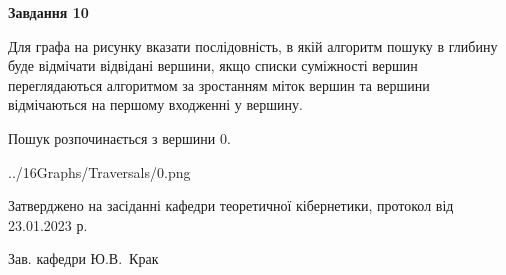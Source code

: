 \documentclass[12pt, ukrainian]{article}
\begin{document}
{\begin {large}
{\begin {center}\textbf{Завдання 10}\end {center}}\par
Для графа на рисунку вказати послідовність, в якій алгоритм пошуку в глибину буде відмічати відвідані вершини, якщо списки суміжності вершин переглядаються алгоритмом за зростанням міток вершин та вершини відмічаються на першому вход\-женні у вершину.\par
Пошук розпочинається з вершини 0.\par

\begin{center}
	{../16Graphs/Traversals/0.png}
\end{center}\par
\newpage


\end {large}
}
{\smallskip \begin {small} Затверджено на засіданні кафедри теоретичної кібернетики, протокол  від   23.01.2023 р.\par\smallskip\smallskip
{\parbox {6.5 cm}{Зав. кафедри \dotfill Ю.В.~Крак}} \end{small}}
\end{document}
